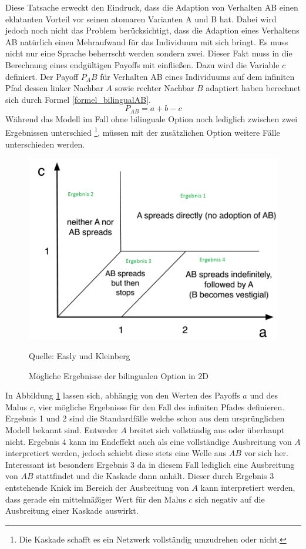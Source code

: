 \documentclass[12pt]{article}
\begin{document}
Diese Tatsache erweckt den Eindruck, dass die Adaption von Verhalten AB einen eklatanten Vorteil vor seinen atomaren Varianten A und B hat. Dabei wird jedoch noch nicht das Problem berücksichtigt, dass die Adaption eines Verhaltens AB natürlich einen Mehraufwand für das Individuum mit sich bringt. Es muss nicht nur eine Sprache beherrscht werden sondern zwei. Dieser Fakt muss in die Berechnung eines endgültigen Payoffs mit einfließen. Dazu wird die Variable $c$ definiert. Der Payoff $P_AB$ für Verhalten AB eines Individuums auf dem infiniten Pfad dessen linker Nachbar $A$ sowie rechter Nachbar $B$ adaptiert haben berechnet sich durch Formel \ref{formel_bilingualAB}.
%
  \begin{equation}
 \label{formel_bilingualAB}
 P_{AB} = a + b - c
 \end{equation}
Während das Modell im Fall ohne bilinguale Option noch lediglich zwischen zwei Ergebnissen unterschied \footnote{Die Kaskade schafft es ein Netzwerk vollständig umzudrehen oder nicht.}, müssen mit der zusätzlichen Option weitere Fälle unterschieden werden.
\begin{figure}
  \begin{center}
    \includegraphics[scale=0.7]{bilingual.png}
      \caption{Mögliche Ergebnisse der bilingualen Option in 2D}
      Quelle: Easly und Kleinberg \cite{Easly10}
  \end{center}

  \label{pic_bilingual}
\end{figure}In Abbildung \ref{pic_bilingual} lassen sich, abhängig von den Werten des Payoffs $a$ und des Malus $c$, vier mögliche Ergebnisse für den Fall des infiniten Pfades definieren.  Ergebnis 1 und 2 sind die Standardfälle welche schon aus dem ursprünglichen Modell bekannt sind. Entweder $A$ breitet sich vollständig aus oder überhaupt nicht. Ergebnis 4 kann im Endeffekt auch als eine vollständige Ausbreitung von $A$ interpretiert werden, jedoch schiebt diese stets eine Welle aus $AB$ vor sich her. Interessant ist besonders Ergebnis 3 da in diesem Fall lediglich eine Ausbreitung von $AB$ stattfindet und die Kaskade dann anhält. Dieser durch Ergebnis 3 entstehende Knick im Bereich der Ausbreitung von $A$ kann interpretiert werden, dass gerade ein mittelmäßiger Wert für den Malus $c$ sich negativ auf die Ausbreitung einer Kaskade auswirkt.
\end{document}
